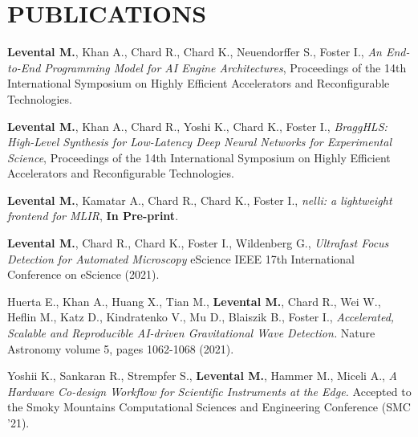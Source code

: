 \documentclass[11pt,letterpaper,roman,colorlinks,linkcolor=blue]{moderncv}
\newcommand*{\modern}{\fontfamily{qhv}\selectfont}
\newcommand{\mystyle}[1]{\textcolor{mygrey}{\modern #1}}
\newcommand{\mysectionstyle}[1]{\large\mystyle{#1}}
\begin{document}
\section{\mysectionstyle{PUBLICATIONS}}

\begin{hangingpar}
\textbf{Levental M.}, Khan A., Chard R., Chard K., Neuendorffer S., Foster I.,
\textit{An End-to-End Programming Model for AI Engine Architectures},
Proceedings of the 14th International Symposium on Highly Efficient Accelerators and Reconfigurable Technologies.
\end{hangingpar}

\begin{hangingpar}
\textbf{Levental M.}, Khan A., Chard R., Yoshi K., Chard K., Foster I.,
\textit{BraggHLS: High-Level Synthesis for Low-Latency Deep Neural Networks for Experimental Science},
Proceedings of the 14th International Symposium on Highly Efficient Accelerators and Reconfigurable Technologies.
\end{hangingpar}

\begin{hangingpar}
\textbf{Levental M.}, Kamatar A., Chard R., Chard K., Foster I.,
\textit{nelli: a lightweight frontend for MLIR},
\textbf{In Pre-print}.
\end{hangingpar}

\begin{hangingpar}
\textbf{Levental M.}, Chard R., Chard K., Foster I., Wildenberg G.,
\textit{Ultrafast Focus Detection for Automated Microscopy} 
eScience IEEE 17th International Conference on eScience (2021).
\end{hangingpar}


\begin{hangingpar}
Huerta E., Khan A., Huang X., Tian M., \textbf{Levental M.}, Chard R., Wei W., Heflin M., Katz D., Kindratenko V., Mu D., Blaiszik B., Foster I.,
\textit{Accelerated, Scalable and Reproducible AI-driven Gravitational Wave Detection.} 
Nature Astronomy volume 5, pages 1062-1068 (2021).
\end{hangingpar}

\begin{hangingpar}
Yoshii K., Sankaran R., Strempfer S., \textbf{Levental M.}, Hammer M., Miceli A.,
\textit{A Hardware Co-design Workflow for Scientific Instruments at the Edge.} 
Accepted to the Smoky Mountains Computational Sciences and Engineering Conference (SMC '21).
\end{hangingpar}
\end{document}
